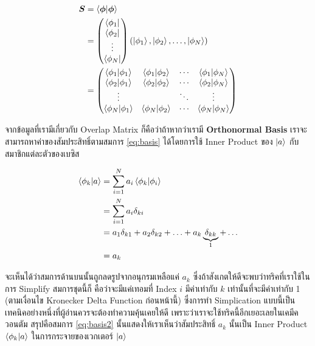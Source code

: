 \begin{align}
    \bm{S}
     & =
    \braket{\boldsymbol \phi}{\boldsymbol \phi }       \\
     & =
    \begin{pmatrix}
        \bra{\phi_1} \\
        \bra{\phi_2} \\
        \vdots       \\
        \bra{\phi_N}
    \end{pmatrix}
    (\ket{\phi_1}, \ket{\phi_2}, \ldots, \ket{\phi_N}) \\
     & =
    \begin{pmatrix}
        \braket{\phi_1}{\phi_1} & \braket{\phi_1}{\phi_2} & \cdots & \braket{\phi_1}{\phi_N} \\
        \braket{\phi_2}{\phi_1} & \braket{\phi_2}{\phi_2} & \cdots & \braket{\phi_2}{\phi_N} \\
        \vdots                  &                         & \ddots & \vdots                  \\
        \braket{\phi_N}{\phi_1} & \braket{\phi_N}{\phi_2} & \cdots & \braket{\phi_N}{\phi_N}
    \end{pmatrix}
\end{align}

จากข้อมูลที่เรามีเกี่ยวกับ Overlap Matrix ก็คือว่าถ้าหากว่าเรามี \textbf{Orthonormal Basis} เราจะสามารถหาค่าของสัมประสิทธิ์ตามสมการ
\eqref{eq:basis} ได้โดยการใช้ Inner Product ของ $\ket{a}$ กับสมาชิกแต่ละตัวของเบซิส

\begin{align}
    \label{eq:basis2}
    \braket{\phi_k}{a}
     & =
    \sum_{i = 1}^N a_i \braket{\phi_k}{\phi_i}                                             \\
     & =
    \sum_{i = 1}^N a_i \delta_{ki}                                                         \\
     & =
    a_1 \delta_{k1} + a_2 \delta_{k2} + \ldots + a_k \underbrace{\delta_{kk}}_{1} + \ldots \\
     & = a_k
\end{align}

\noindent จะเห็นได้ว่าสมการด้านบนนั้นถูกลดรูปจากอนุกรมเหลือแค่ $a_k$ ซึ่งถ้าสังเกตให้ดีจะพบว่าทริคที่เราใช้ในการ Simplify สมการชุดนี้ก็%
คือว่าจะมีแค่เทอมที่ Index $i$ มีค่าเท่ากับ $k$ เท่านั้นที่จะมีค่าเท่ากับ 1 (ตามเงื่อนไข Kronecker Delta Function ก่อนหน้านี้) ซึ่งการทำ
Simplication แบบนี้เป็นเทคนิคอย่างหนึ่งที่ผู้อ่านควรจะต้องทำความคุ้นเคยให้ดี เพราะว่าเราจะใช้ทริคนี้อีกเยอะเลยในเคมีควอนตัม
สรุปคือสมการ \eqref{eq:basis2} นั้นแสดงให้เราเห็นว่าสัมประสิทธิ์ $a_k$ นั้นเป็น Inner Product $\braket{\phi_k}{a}$
ในการกระจายของเวกเตอร์ $\ket{a}$

